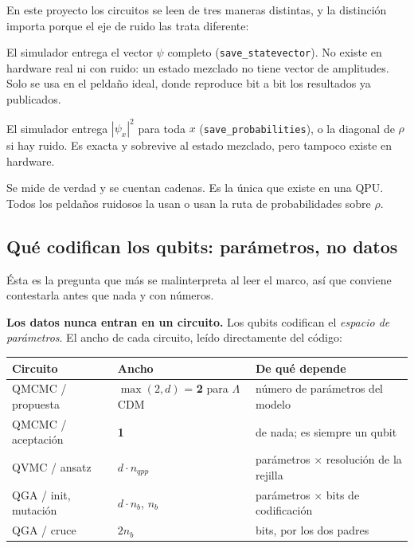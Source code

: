 \documentclass[11pt,a4paper]{article}
\begin{document}
\medskip
En este proyecto los circuitos se leen de tres maneras distintas, y la
distinción importa porque el eje de ruido las trata diferente:

\begin{description}[leftmargin=1.6em,style=nextline]
  \item[Ruta de amplitud.] El simulador entrega el vector $\psi$ completo
    (\texttt{save\_statevector}). No existe en hardware real ni con ruido:
    un estado mezclado no tiene vector de amplitudes. Solo se usa en el
    peldaño ideal, donde reproduce bit a bit los resultados ya publicados.
  \item[Ruta de probabilidades.] El simulador entrega $|\psi_x|^2$ para toda
    $x$ (\texttt{save\_probabilities}), o la diagonal de $\rho$ si hay ruido.
    Es exacta y sobrevive al estado mezclado, pero tampoco existe en
    hardware.
  \item[Ruta de cuentas.] Se mide de verdad y se cuentan cadenas. Es la única
    que existe en una QPU. Todos los peldaños ruidosos la usan o usan la
    ruta de probabilidades sobre $\rho$.
\end{description}

\subsection{Qué codifican los qubits: parámetros, no datos}
\label{sec:queentra}

Ésta es la pregunta que más se malinterpreta al leer el marco, así que
conviene contestarla antes que nada y con números.

\textbf{Los datos nunca entran en un circuito.} Los qubits codifican el
\emph{espacio de parámetros}. El ancho de cada circuito, leído directamente
del código:

\begin{center}
\small
\begin{tabular}{llp{5.4cm}}
\toprule
\textbf{Circuito} & \textbf{Ancho} & \textbf{De qué depende} \\
\midrule
QMCMC / propuesta     & $\max(2,d)$ \;=\; \textbf{2} para $\Lambda$CDM
                      & número de parámetros del modelo \\
QMCMC / aceptación    & \textbf{1}
                      & de nada; es siempre un qubit \\
QVMC / ansatz         & $d \cdot n_{qpp}$
                      & parámetros $\times$ resolución de la rejilla \\
QGA / init, mutación  & $d \cdot n_b$, \; $n_b$
                      & parámetros $\times$ bits de codificación \\
QGA / cruce           & $2 n_b$
                      & bits, por los dos padres \\
\bottomrule
\end{tabular}
\end{center}
\end{document}
